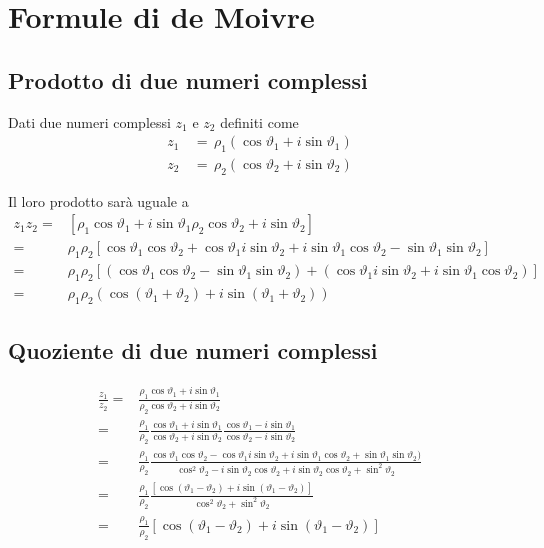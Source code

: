 \documentclass[../../dimostrazioni]{subfiles}
\begin{document}
    \chapter{Formule di de Moivre}

        \section*{Prodotto di due numeri complessi}

            Dati due numeri complessi \(z_1\) e \(z_2\) definiti come
            \begin{align*}
                z_1 \, &= \, \rho_1(\cos\vartheta_1 + i\sin\vartheta_1)\\
                z_2 \, &= \, \rho_2(\cos\vartheta_2 + i\sin\vartheta_2)
            \end{align*}

            Il loro prodotto sarà uguale a
            \begin{align*}
                z_1z_2 =& [\rho_1\cos\vartheta_1+i\sin\vartheta_1\rho_2\cos\vartheta_2+i\sin\vartheta_2] \\
                       =& \rho_1\rho_2 [\cos\vartheta_1\cos\vartheta_2 + \cos\vartheta_1i\sin\vartheta_2 + i\sin\vartheta_1\cos\vartheta_2 - \sin\vartheta_1\sin\vartheta_2] \\
                       =& \rho_1\rho_2 [(\cos\vartheta_1\cos\vartheta_2 - \sin\vartheta_1\sin\vartheta_2) + (\cos\vartheta_1 i\sin\vartheta_2 + i\sin\vartheta_1\cos\vartheta_2)] \\
                       =& \rho_1\rho_2 (\cos(\vartheta_1 + \vartheta_2) + i\sin(\vartheta_1 + \vartheta_2))
            \end{align*}

        \section*{Quoziente di due numeri complessi}

            \begin{align*}
                \frac{z_1}{z_2} =& \frac{\rho_1\cos\vartheta_1+i\sin\vartheta_1}{\rho_2\cos\vartheta_2+i\sin\vartheta_2} \\
                                =& \frac{\rho_1}{\rho_2} \frac{\cos\vartheta_1+i\sin\vartheta_1}{\cos\vartheta_2+i\sin\vartheta_2} \frac{\cos\vartheta_1-i\sin\vartheta_1}{\cos\vartheta_2-i\sin\vartheta_2}\\
                                =& \frac{\rho_1}{\rho_2} \frac{\cos\vartheta_1\cos\vartheta_2 - \cos\vartheta_1 i\sin\vartheta_2 + i\sin\vartheta_1\cos\vartheta_2 + \sin\vartheta_1\sin\vartheta_2)}{\cos^2\vartheta_2 - i\sin\vartheta_2\cos\vartheta_2 + i\sin\vartheta_2\cos\vartheta_2 + \sin^2\vartheta_2} \\
                                =& \frac{\rho_1}{\rho_2} \frac{[\cos(\vartheta_1 - \vartheta_2) + i\sin(\vartheta_1 - \vartheta_2)]}{\cos^2\vartheta_2 + \sin^2\vartheta_2} \\
                                =& \frac{\rho_1}{\rho_2} [\cos(\vartheta_1 - \vartheta_2) + i\sin(\vartheta_1 - \vartheta_2)]
            \end{align*}
\end{document}
